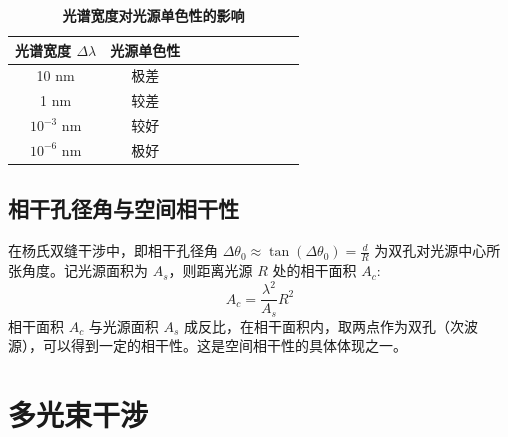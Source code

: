 \documentclass[UTF8]{report}
\theoremstyle{MyLineTheoremStyle} %
\theoremstyle{MyBlockTheoremStyle} %
\theoremstyle{MySubsubsectionStyle} %
\begin{document}
\begin{table}[H]\centering
    \caption{\textbf{光谱宽度对光源单色性的影响}}
    \label{光谱宽度对光源单色性的影响}
\begin{tabular}{cccccccccc}\toprule
    光谱宽度 $\Delta \lambda$ & 光源单色性  \\
    \midrule
    10 nm & 极差 \\
    1 nm &  较差 \\
    $10^{-3}$ nm & 较好 \\
    $10^{-6}$ nm & 极好 \\
    \bottomrule
\end{tabular}
\end{table}

\subsection{相干孔径角与空间相干性}

在杨氏双缝干涉中，即相干孔径角 $\Delta \theta_0 \approx \tan \left(\Delta \theta_0\right) = \frac{d}{R}$ 为双孔对光源中心所张角度。记光源面积为 $A_s$，则距离光源 $R$ 处的相干面积 $A_c$: 
\begin{equation}
A_c = \frac{\lambda^2}{A_s} R^2
\end{equation}
相干面积 $A_c$ 与光源面积 $A_s$ 成反比，在相干面积内，取两点作为双孔（次波源），可以得到一定的相干性。这是空间相干性的具体体现之一。

\section{多光束干涉}
\end{document}
